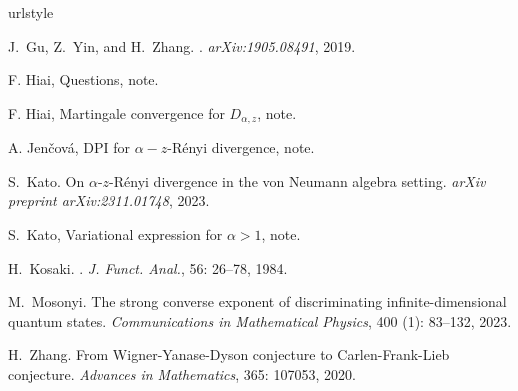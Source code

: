 \documentclass[12pt]{article}
\theoremstyle{definition}
\theoremstyle{remark}
\begin{document}
\begin{thebibliography}{5}
\providecommand{\natexlab}[1]{#1}
\providecommand{\url}[1]{\texttt{#1}}
\expandafter\ifx\csname urlstyle\endcsname\relax
  \providecommand{\doi}[1]{doi: #1}\else
  \providecommand{\doi}{doi: \begingroup \urlstyle{rm}\Url}\fi

J.~Gu, Z.~Yin, and H.~Zhang.
.
\newblock \emph{arXiv:1905.08491}, 2019.

 F. Hiai, Questions, note.

 F. Hiai, Martingale convergence for $D_{\alpha,z}$, note.

 A. Jen{\v c}ov\'a, DPI for $\alpha-z$-R\'enyi divergence, note.

S.~Kato.
\newblock On $\alpha $-$ z $-{R}\'enyi divergence in the von
  {N}eumann algebra setting.
\newblock \emph{arXiv preprint arXiv:2311.01748}, 2023.

 S.~Kato, Variational expression for $\alpha>1$, note.

H.~Kosaki.
.
\newblock \emph{{J. Funct. Anal.}}, {56}: {26--78}, {1984}.

M.~Mosonyi.
\newblock The strong converse exponent of discriminating infinite-dimensional
  quantum states.
\newblock \emph{Communications in Mathematical Physics}, 400
  (1): 83--132, 2023.

H.~Zhang.
\newblock From Wigner-Yanase-Dyson conjecture to Carlen-Frank-Lieb conjecture.
\newblock \emph{Advances in Mathematics}, 365: 107053, 2020.

\end{thebibliography}
\end{document}

